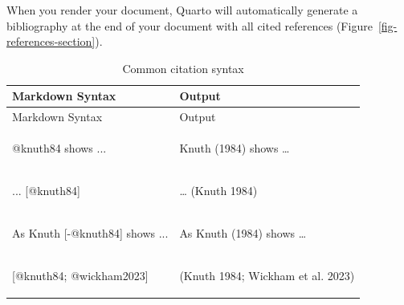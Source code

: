 \documentclass[
  letterpaper,
  DIV=11,
  numbers=noendperiod,
  oneside]{scrreprt}
\newenvironment{Shaded}{\begin{snugshade}}{\end{snugshade}}
\newcommand{\CommentTok}[1]{\textcolor[rgb]{0.37,0.37,0.37}{#1}}
\newcommand{\NormalTok}[1]{\textcolor[rgb]{0.00,0.23,0.31}{#1}}
\newcommand{\OtherTok}[1]{\textcolor[rgb]{0.00,0.23,0.31}{#1}}
\begin{document}
\begin{tcolorbox}
When you render your document, Quarto will automatically generate a
bibliography at the end of your document with all cited references
(Figure~\ref{fig-references-section}).

\begin{longtable}[]{@{}
  >{\raggedright\arraybackslash}p{}
  >{\raggedright\arraybackslash}p{}@{}}
\caption[]{Common citation
syntax}\label{tbl-citation-syntax}\tabularnewline
\toprule\noalign{}
Markdown Syntax & Output \\
\midrule\noalign{}
\endfirsthead
\toprule\noalign{}
Markdown Syntax & Output \\
\midrule\noalign{}
\endhead
\bottomrule\noalign{}
\endlastfoot
\begin{Shaded}
\begin{Highlighting}[]
\NormalTok{@knuth84 shows ...}
\end{Highlighting}
\end{Shaded}
& Knuth (1984) shows \ldots{} \\
\begin{Shaded}
\begin{Highlighting}[]
\NormalTok{... }\CommentTok{[}\OtherTok{@knuth84}\CommentTok{]}
\end{Highlighting}
\end{Shaded}
& \ldots{} (Knuth 1984) \\
\begin{Shaded}
\begin{Highlighting}[]
\NormalTok{As Knuth }\CommentTok{[}\OtherTok{{-}@knuth84}\CommentTok{]}\NormalTok{ shows ...}
\end{Highlighting}
\end{Shaded}
& As Knuth (1984) shows \ldots{} \\
\begin{Shaded}
\begin{Highlighting}[]
\CommentTok{[}\OtherTok{@knuth84; @wickham2023}\CommentTok{]}
\end{Highlighting}
\end{Shaded}
& (Knuth 1984; Wickham et al. 2023) \\
\end{longtable}

\begin{figure}[H]

\end{figure}
\end{tcolorbox}
\end{document}
